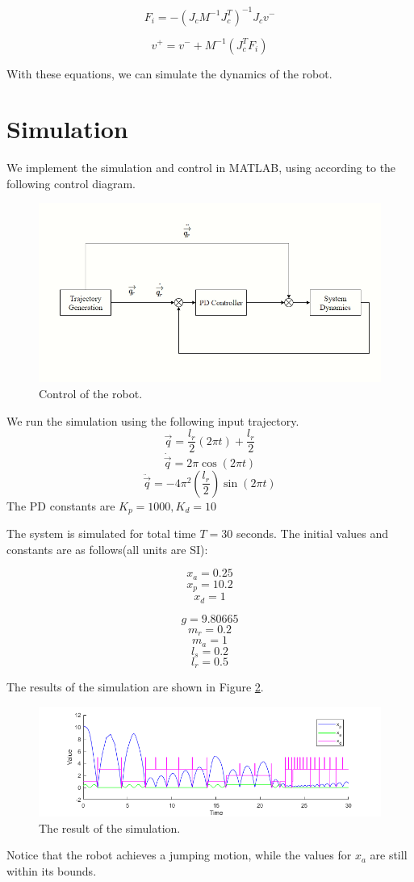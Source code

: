 \documentclass[12pt, a4paper]{report}
\begin{document}
\begin{equation}
F_{i} = -(J_{c}M^{-1}J_{c}^{T})^{-1}J_{c}v^{-}
\end{equation}

\begin{equation}
	v^{+} = v^{-} + M^{-1}(J_{c}^{T}F_{i})
\end{equation}

With these equations, we can simulate the dynamics of the robot.


\section*{Simulation}
We implement the simulation and control in MATLAB, using according to the following control diagram.

\begin{figure}[h]
	\vspace{1pt}
	\centering
	\includegraphics[scale=0.7]{images/system.jpg} 
	\caption{Control of the robot.}
	\label{fig:blockdiagram}
\end{figure}\par
We run the simulation using the following input trajectory.
$$\vec{q} = \frac{l_{r}}{2}(2\pi t)+\frac{l_{r}}{2}$$
$$\dot{\vec{q}} = 2\pi\cos(2\pi t)$$
$$\ddot{\vec{q}} = -4\pi^{2}(\frac{l_{r}}{2})\sin(2\pi t)$$
The PD constants are $K_{p} = 1000, K_{d} = 10$\par
The system is simulated for total time $T = 30 $ seconds. The initial values and constants are as follows(all units are SI):\par 
$$x_{a} = 0.25$$
$$x_{p} = 10.2$$
$$x_{d} = 1$$

$$g = 9.80665$$
$$m_{r} = 0.2$$
$$m_{a} = 1$$
$$l_{s} = 0.2$$
$$l_{r} = 0.5$$

The results of the simulation are shown in Figure \ref{fig:result}.

\begin{figure}[h]
	\vspace{1pt}
	\centering
	\includegraphics[scale=0.8]{images/simulation.png} 
	\caption{The result of the simulation.}
	\label{fig:result}
\end{figure}\par

Notice that the robot achieves a jumping motion, while the values for $x_{a}$ are still within its bounds.
\end{document}
